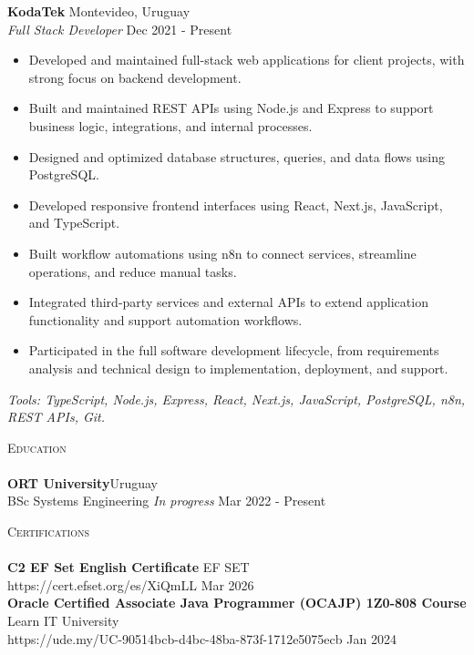 \documentclass[11pt,a4paper]{article}
\newcommand{\lineunder} {
    \vspace*{-8pt} \\
    \hspace*{-18pt} \hrulefill \\
}
\newcommand{\header} [1] {
    {\hspace*{-18pt}\vspace*{6pt} \textsc{#1}}
    \vspace*{-6pt} \lineunder
}
\begin{document}
\textbf{KodaTek} \hfill Montevideo, Uruguay\\
\textit{Full Stack Developer} \hfill Dec 2021 - Present\\
\vspace{-1mm}
\begin{itemize} \itemsep -1pt
	\item Developed and maintained full-stack web applications for client projects, with strong focus on backend development.
	\item Built and maintained REST APIs using Node.js and Express to support business logic, integrations, and internal processes.
	\item Designed and optimized database structures, queries, and data flows using PostgreSQL.
	\item Developed responsive frontend interfaces using React, Next.js, JavaScript, and TypeScript.
	\item Built workflow automations using n8n to connect services, streamline operations, and reduce manual tasks.
	\item Integrated third-party services and external APIs to extend application functionality and support automation workflows.
	\item Participated in the full software development lifecycle, from requirements analysis and technical design to implementation, deployment, and support.
\end{itemize}
\vspace{-1mm}
\textit{Tools: TypeScript, Node.js, Express, React, Next.js, JavaScript, PostgreSQL, n8n, REST APIs, Git.}
\vspace{1.5mm}

\header{Education}
\textbf{ORT University}\hfill Uruguay\\
BSc Systems Engineering \textit{In progress} \hfill Mar 2022 - Present\\
\vspace{1.5mm}





\header{Certifications}
\textbf{C2 EF Set English Certificate} \hfill EF SET\\
https://cert.efset.org/es/XiQmLL \hfill Mar 2026\\
\vspace*{1mm}
\textbf{Oracle Certified Associate Java Programmer (OCAJP) 1Z0-808 Course} \hfill Learn IT University\\
https://ude.my/UC-90514bcb-d4bc-48ba-873f-1712e5075ecb \hfill Jan 2024\\
\vspace*{1mm}

\ 
\end{document}
